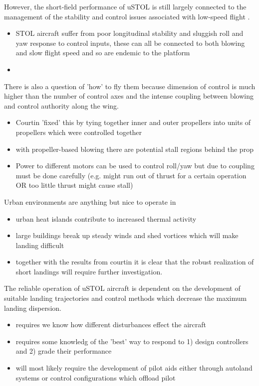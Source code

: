 \documentclass[]{article}
\begin{document}
		However, the short-field performance of uSTOL is still largely connected to the management of the stability and control issues associated with low-speed flight \cite{courtin_performance_nodate}.  
		\begin{itemize}
			\item STOL aircraft suffer from poor longitudinal stability and sluggish roll and yaw response to control inputs, these can all be connected to both blowing and slow flight speed and so are endemic to the platform
			\item
		\end{itemize}
		There is also a question of 'how' to fly them because dimension of control is much higher than the number of control axes and the intense coupling between blowing and control authority along the wing.
		\begin{itemize}
			\item Courtin 'fixed' this by tying together inner and outer propellers into units of propellers which were controlled together \cite{courtin_performance_nodate}
			\item with propeller-based blowing there are potential stall regions behind the prop \cite{long_experimental_nodate,courtin_flight_2020}
			\item Power to different motors can be used to control roll/yaw but due to coupling must be done carefully \cite{courtin_performance_nodate} (e.g. might run out of thrust for a certain operation OR too little thrust might cause stall)
		\end{itemize}
		Urban environments are anything but nice to operate in
		\begin{itemize}
			\item urban heat islands contribute to increased thermal activity
			\item large buildings break up steady winds and shed vortices which will make landing difficult
			\item together with the results from courtin it is clear that the robust realization of short landings will require further investigation.
		\end{itemize}
		The reliable operation of uSTOL aircraft is dependent on the development of suitable landing trajectories and control methods which decrease the maximum landing dispersion. 
		\begin{itemize}
			\item requires we know how different disturbances effect the aircraft
			\item requires some knowledg of the 'best' way to respond to 1) design controllers and 2) grade their performance
			\item will most likely require the development of pilot aids either through autoland systems or control configurations which offload pilot
		\end{itemize}
\end{document}
